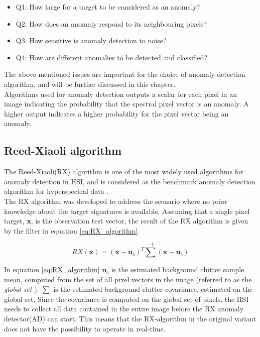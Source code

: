 \begin{itemize}
  \item Q1: How large for a target to be considered as an anomaly?
  \item Q2: How does an anomaly respond to its neighbouring pixels?
  \item Q3: How sensitive is anomaly detection to noise?
  \item Q4: How are different anomalies to be detected and classified?
\end{itemize}

The above-mentioned issues are important for the choice of anomaly detection algorithm, and will be further discussed in this chapter.
\\
Algorithms used for anomaly detection outputs a scalar for each pixel in an image indicating the probability that the spectral pixel vector is an anomaly. A higher output indicates a higher probability for the pixel vector being an anomaly.


\subsection{Reed-Xiaoli algorithm}
\label{sec:RX_theory}
The Reed-Xiaoli(RX) algorithm \cite{reed1990adaptive} is one of the most widely used algorithms for anomaly detection in HSI, and is considered as the benchmark anomaly detection algorithm for hyperspectral data \cite{yang2015dual}.  
\\
The RX algorithm was developed to address the scenario where no prior knowledge about the target signatures is available. Assuming that a single pixel target, \textbf{x}, is the observation test vector, the result of the RX algorithm is given by the filter in equation \ref{eq:RX_algorithm}.

\begin{equation}
    RX(\textbf{x}) = (\textbf{x} - \textbf{u}_b)^T \sum^{-1} (\textbf{x} - \textbf{u}_b)	
\label{eq:RX_algorithm}
\end{equation}

In equation \ref{eq:RX_algorithm} $\textbf{u}_b$ is the estimated background clutter sample mean, computed from the set of all pixel vectors in the image (referred to as the \textit{global set}  ). $\sum$ is the estimated background clutter covariance, estimated on the global set. Since the covariance is computed on the global set of pixels, the HSI needs to collect all data contained in the entire image before the RX anomaly detector(AD) can start. This means that the RX-algorithm in the original variant does not have the possibility to operate in real-time. 

